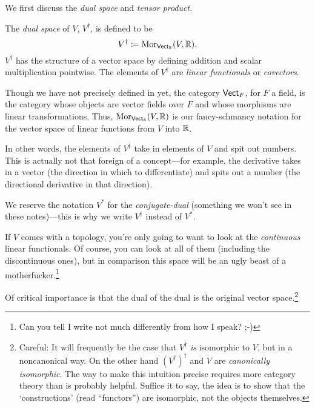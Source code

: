 We first discuss the \emph{dual space} and \emph{tensor product}.
\begin{dfn}\label{DualSpace}
The \emph{dual space} of $V$, $V^{\dagger}$, is defined to be
\begin{equation}
V^{\dagger}\coloneqq \operatorname{Mor} _{\mathsf{Vect} _{\mathbb{R}}}(V,\mathbb{R} ).
\end{equation}
$V^{\dagger}$ has the structure of a vector space by defining addition and scalar multiplication pointwise.  The elements of $V^{\dagger}$ are \emph{linear functionals} or \emph{covectors}.
\begin{rmk}
Though we have not precisely defined in yet, the category $\mathsf{Vect} _F$, for $F$ a field, is the category whose objects are vector fields over $F$ and whose morphisms are linear transformations.  Thus, $\operatorname{Mor} _{\mathsf{Vect} _{\mathbb{R}}}(V,\mathbb{R} )$ is our fancy-schmancy notation for the vector space of linear functions from $V$ into $\mathbb{R}$.
\end{rmk}
\begin{rmk}
In other words, the elements of $V^{\dagger}$ take in elements of $V$ and spit out numbers.  This is actually not that foreign of a concept---for example, the derivative takes in a vector (the direction in which to differentiate) and spits out a number (the directional derivative in that direction).
\end{rmk}
\begin{rmk}
We reserve the notation $V^*$ for the \emph{conjugate-dual} (something we won't see in these notes)---this is why we write $V^{\dagger}$ instead of $V^*$.
\end{rmk}
\begin{rmk}
If $V$ comes with a topology, you're only going to want to look at the \emph{continuous} linear functionals.  Of course, you can look at all of them (including the discontinuous ones), but in comparison this space will be an ugly beast of a motherfucker.\footnote{Can you tell I write not much differently from how I speak?  ;-)}
\end{rmk}
\end{dfn}
Of critical importance is that the dual of the dual is the original vector space.\footnote{Careful:  It will frequently be the case that $V^{\dagger}$ \emph{is} isomorphic to $V$, but in a noncanonical way.  On the other hand $(V^{\dagger})^{\dagger}$ and $V$ are \emph{canonically isomorphic}.  The way to make this intuition precise requires more category theory than is probably helpful.  Suffice it to say, the idea is to show that the `constructions' (read ``functors'') are isomorphic, not the objects themselves.}
